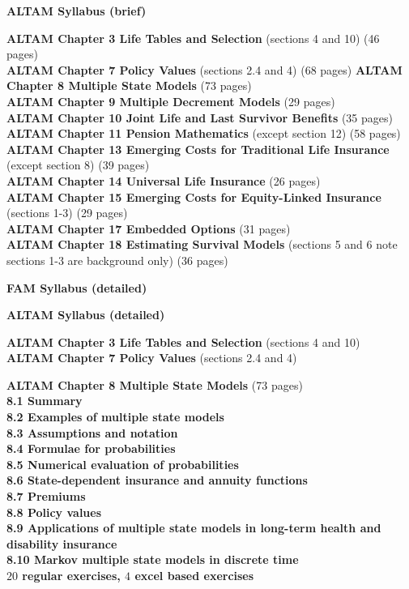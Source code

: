\documentclass[hidelinks, 12pt]{article}
\theoremstyle{mydefstyle}
\theoremstyle{mythmstyle}
\begin{document}
\textbf{ALTAM Syllabus (brief)}

\textbf{ALTAM Chapter 3 Life Tables and Selection} (sections 4 and 10) (46 pages) \\
\textbf{ALTAM Chapter 7 Policy Values} (sections 2.4 and 4) (68 pages)
\textbf{ALTAM Chapter 8 Multiple State Models} (73 pages) \\
\textbf{ALTAM Chapter 9 Multiple Decrement Models} (29 pages) \\
\textbf{ALTAM Chapter 10 Joint Life and Last Survivor Benefits} (35 pages) \\
\textbf{ALTAM Chapter 11 Pension Mathematics} (except section 12) (58 pages) \\
\textbf{ALTAM Chapter 13 Emerging Costs for Traditional Life Insurance} (except section 8) (39 pages) \\
\textbf{ALTAM Chapter 14 Universal Life Insurance} (26 pages) \\
\textbf{ALTAM Chapter 15 Emerging Costs for Equity-Linked Insurance} (sections 1-3) (29 pages) \\
\textbf{ALTAM Chapter 17 Embedded Options} (31 pages) \\
\textbf{ALTAM Chapter 18 Estimating Survival Models} (sections 5 and 6 note sections 1-3 are background only) (36 pages)

\textbf{FAM Syllabus (detailed)}

\textbf{ALTAM Syllabus (detailed)}

\textbf{ALTAM Chapter 3 Life Tables and Selection} (sections 4 and 10) \\
\textbf{ALTAM Chapter 7 Policy Values} (sections 2.4 and 4)

\textbf{ALTAM Chapter 8 Multiple State Models} (73 pages) \\
\textbf{8.1 Summary} \\
\textbf{8.2 Examples of multiple state models} \\
\textbf{8.3 Assumptions and notation} \\
\textbf{8.4 Formulae for probabilities} \\
\textbf{8.5 Numerical evaluation of probabilities} \\
\textbf{8.6 State-dependent insurance and annuity functions} \\
\textbf{8.7 Premiums} \\
\textbf{8.8 Policy values} \\
\textbf{8.9 Applications of multiple state models in long-term health and disability insurance} \\
\textbf{8.10 Markov multiple state models in discrete time} \\
\textbf{$20$ regular exercises, $4$ excel based exercises}
\end{document}
